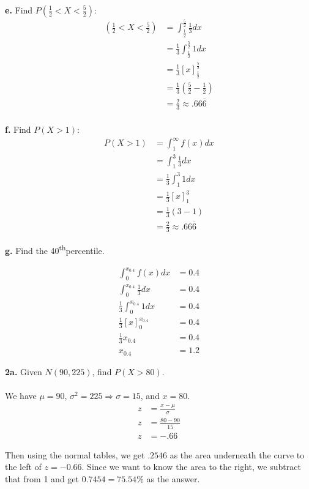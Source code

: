 \documentclass[12pt]{report}
\newcommand{\thn}{\textsuperscript{th}}
\begin{document}
\pagebreak

\noindent \textbf{e.} Find $P(\frac{1}{2} < X < \frac{5}{2})$:
\begin{align*}
(\frac{1}{2} < X < \frac{5}{2}) &= \int_{\frac{1}{2}}^{\frac{5}{2}}\frac{1}{3}dx\\
&= \frac{1}{3}\int_{\frac{1}{2}}^{\frac{5}{2}}1dx\\
&= \frac{1}{3}\left[x\right]_{\frac{1}{2}}^{\frac{5}{2}}\\
&= \frac{1}{3}\left(\frac{5}{2} - \frac{1}{2}\right)\\
&= \boxed{\frac{2}{3} \approx .66\overline{6}}\\
\end{align*}

\noindent \textbf{f.} Find $P(X > 1)$:
\begin{align*}
P(X > 1) &= \int_1^{\infty}f(x)dx\\
&= \int_{1}^{3}\frac{1}{3}dx\\
&= \frac{1}{3}\int_{1}^{3}1dx\\
&= \frac{1}{3}\left[x\right]_1^3\\
&= \frac{1}{3}(3-1)\\
&= \boxed{\frac{2}{3} \approx .66\overline{6}}
\end{align*}

\pagebreak

\noindent \textbf{g.} Find the 40\thn percentile.

\begin{align*}
\int_{0}^{x_{0.4}}f(x)dx &= 0.4\\
\int_{0}^{x_{0.4}}\frac{1}{3}dx &= 0.4\\
\frac{1}{3}\int_{0}^{x_{0.4}}1dx &= 0.4\\
\frac{1}{3}[x]_0^{x_{0.4}} &= 0.4\\
\frac{1}{3}x_{0.4} &= 0.4\\
x_{0.4} &= \boxed{1.2}
\end{align*}

\noindent \textbf{2a.} Given $N(90, 225)$, find $P(X > 80)$.\\\\
\noindent We have $\mu = 90$, $\sigma^2=225 \Rightarrow \sigma = 15$, and $x = 80$.
\begin{align*}
z &= \frac{x - \mu}{\sigma}\\
z &= \frac{80 - 90}{15}\\
z &= -.66
\end{align*}

\noindent Then using the normal tables, we get $.2546$ as the area underneath the curve to the left of $z = -0.66$. Since we want to know the area to the right, we subtract that from 1 and get $\boxed{0.7454} = 75.54\%$ as the answer.\\
\end{document}
